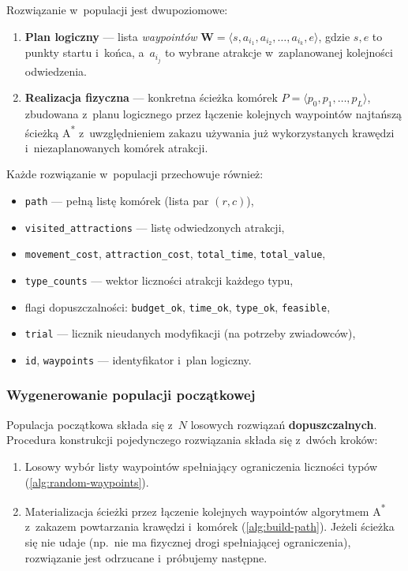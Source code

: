 Rozwiązanie w~populacji jest dwupoziomowe:

\begin{enumerate}
    \item \textbf{Plan logiczny} --- lista \emph{waypointów}
          $\mathbf{W} = \langle s, a_{i_1}, a_{i_2}, \dots, a_{i_k}, e \rangle$,
          gdzie $s,e$ to punkty startu i~końca, a~$a_{i_j}$ to wybrane atrakcje
          w~zaplanowanej kolejności odwiedzenia.
    \item \textbf{Realizacja fizyczna} --- konkretna ścieżka komórek
          $P = \langle p_0, p_1, \dots, p_L \rangle$, zbudowana z~planu
          logicznego przez łączenie kolejnych waypointów najtańszą ścieżką
          A\textsuperscript{*} z~uwzględnieniem zakazu używania już wykorzystanych
          krawędzi i~niezaplanowanych komórek atrakcji.
\end{enumerate}

Każde rozwiązanie w~populacji przechowuje również:
\begin{itemize}
    \item \texttt{path} --- pełną listę komórek (lista par $(r,c)$),
    \item \texttt{visited\_attractions} --- listę odwiedzonych atrakcji,
    \item \texttt{movement\_cost}, \texttt{attraction\_cost}, \texttt{total\_time}, \texttt{total\_value},
    \item \texttt{type\_counts} --- wektor liczności atrakcji każdego typu,
    \item flagi dopuszczalności: \texttt{budget\_ok}, \texttt{time\_ok}, \texttt{type\_ok}, \texttt{feasible},
    \item \texttt{trial} --- licznik nieudanych modyfikacji (na potrzeby zwiadowców),
    \item \texttt{id}, \texttt{waypoints} --- identyfikator i~plan logiczny.
\end{itemize}

\subsubsection{Wygenerowanie populacji początkowej}
\label{sec:init-pop}

Populacja początkowa składa się z~$N$ losowych rozwiązań \textbf{dopuszczalnych}.
Procedura konstrukcji pojedynczego rozwiązania składa się z~dwóch kroków:

\begin{enumerate}
    \item Losowy wybór listy waypointów spełniający ograniczenia liczności
          typów (\cref{alg:random-waypoints}).
    \item Materializacja ścieżki przez łączenie kolejnych waypointów
          algorytmem A\textsuperscript{*} z~zakazem powtarzania krawędzi
          i~komórek (\cref{alg:build-path}). Jeżeli ścieżka się nie udaje
          (np.\ nie ma fizycznej drogi spełniającej ograniczenia),
          rozwiązanie jest odrzucane i~próbujemy następne.
\end{enumerate}

